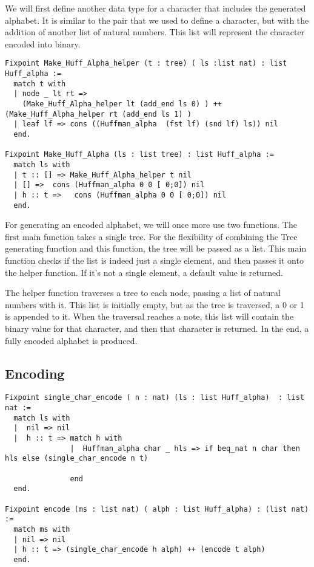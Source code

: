 \documentclass{llncs}
\begin{document}
We will first define another data type for a character that includes the generated alphabet. It is similar to the pair that we used to define a character, but with the addition of another list of natural numbers. This list will represent the character encoded into binary.

\begin{lstlisting}
Fixpoint Make_Huff_Alpha_helper (t : tree) ( ls :list nat) : list Huff_alpha :=
  match t with
  | node _ lt rt =>
    (Make_Huff_Alpha_helper lt (add_end ls 0) ) ++  (Make_Huff_Alpha_helper rt (add_end ls 1) )
  | leaf lf => cons ((Huffman_alpha  (fst lf) (snd lf) ls)) nil
  end.
  
Fixpoint Make_Huff_Alpha (ls : list tree) : list Huff_alpha :=
  match ls with
  | t :: [] => Make_Huff_Alpha_helper t nil
  | [] =>  cons (Huffman_alpha 0 0 [ 0;0]) nil
  | h :: t =>   cons (Huffman_alpha 0 0 [ 0;0]) nil
  end.
\end{lstlisting}

For generating an encoded alphabet, we will once more use two functions. The first main function takes a single tree. For the flexibility of combining the Tree generating function and this function, the tree will be passed as a list. This main function checks if the list is indeed just a single element, and then passes it onto the helper function. If it’s not a single element, a default value is returned. 

The helper function traverses a tree to each node, passing a list of natural numbers with it. This list is initially empty, but as the tree is traversed, a 0 or 1 is appended to it. When the traversal reaches a note, this list will contain the binary value for  that character, and then that character is returned. In the end, a fully encoded alphabet is produced. 


\subsection{Encoding}

\begin{lstlisting}
Fixpoint single_char_encode ( n : nat) (ls : list Huff_alpha)  : list nat :=
  match ls with
  |  nil => nil
  |  h :: t => match h with
               |  Huffman_alpha char _ hls => if beq_nat n char then hls else (single_char_encode n t)
         
               end
  end.

Fixpoint encode (ms : list nat) ( alph : list Huff_alpha) : (list nat)  :=
  match ms with
  | nil => nil
  | h :: t => (single_char_encode h alph) ++ (encode t alph)
  end.
\end{lstlisting}
\end{document}
